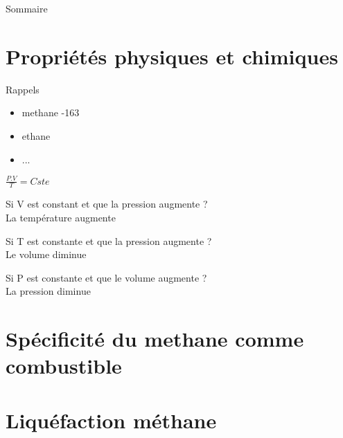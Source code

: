 \documentclass[xcolor=dvipsnames,hyperref={breaklinks=true},mathserif,
professionalfont,12pt]{beamer}
\author{Cyrille Reggio}
\begin{document}
    
    \begin{frame}{Sommaire}
        \tableofcontents
    \end{frame}

 \section{Propriétés physiques et chimiques}
\begin{frame}{Rappels}
 \begin{itemize}
  \item methane -163
  \item ethane
  \item ...
 \end{itemize}

\end{frame}

\begin{frame}
\centering

\large
 $\frac{P.V}{T}=Cste$
\end{frame}

\begin{frame}
 Si V est constant et que la pression augmente ?\\
  La température augmente
\end{frame}

\begin{frame}
 Si T est constante et que la pression augmente ?\\
  Le volume diminue
\end{frame}

\begin{frame}
\end{frame}

\begin{frame}
 Si P est constante et que le volume augmente ?\\
  La pression diminue
\end{frame}

\section{Spécificité du methane comme combustible}

\begin{frame}
 
\end{frame}

\section{Liquéfaction méthane}
\end{document}
